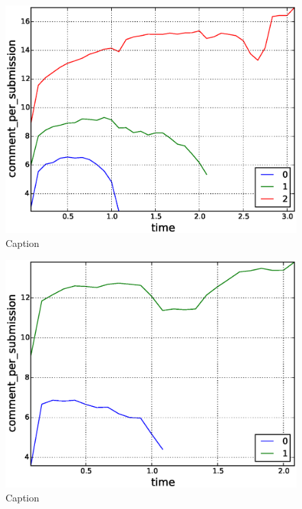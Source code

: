 \begin{figure}[!tb]
\centering
\includegraphics[scale=0.4]{./images/comments_per_submissions_for_surviving_year_for_2012.eps}
\caption{Caption}
\label{fig:comments_per_submissions_for_surviving_year_for_2012}
\end{figure}

\begin{figure}[!tb]
\centering
\includegraphics[scale=0.4]{./images/comments_per_submissions_for_surviving_year_for_2013.eps}
\caption{Caption}
\label{fig:comments_per_submissions_for_surviving_year_for_2013}
\end{figure}

